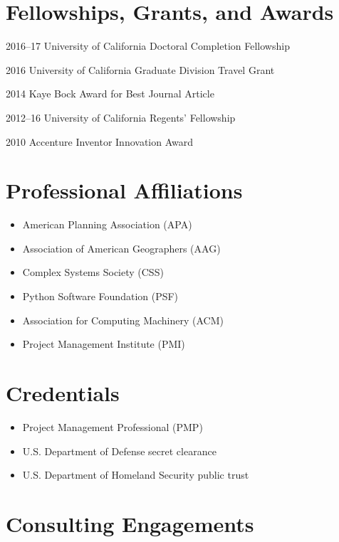 \documentclass{academiccv}
\begin{document}
\section*{Fellowships, Grants, and Awards}

\begin{tablist}
\item[2016--17] \tab University of California Doctoral Completion Fellowship
\item[2016]     \tab University of California Graduate Division Travel Grant
\item[2014]     \tab Kaye Bock Award for Best Journal Article
\item[2012--16] \tab University of California Regents' Fellowship
\item[2010]     \tab Accenture Inventor Innovation Award
\end{tablist}



\section*{Professional Affiliations}

\begin{itemize}
\item American Planning Association (APA)
\item Association of American Geographers (AAG)
\item Complex Systems Society (CSS)
\item Python Software Foundation (PSF)
\item Association for Computing Machinery (ACM)
\item Project Management Institute (PMI)
\end{itemize}



\section*{Credentials}

\begin{itemize}
\item Project Management Professional (PMP)
\item U.S. Department of Defense secret clearance
\item U.S. Department of Homeland Security public trust
\end{itemize}



\section*{Consulting Engagements}
\end{document}
